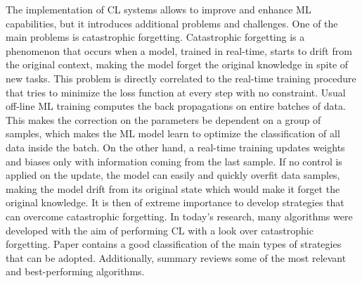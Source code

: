 \documentclass[12pt]{report}
\begin{document}
The implementation of CL systems allows to improve and enhance ML capabilities, but it introduces additional problems and challenges. One of the main problems is catastrophic forgetting. Catastrophic forgetting \cite{french1999catastrophic} is a phenomenon that occurs when a model, trained in real-time, starts to drift from the original context, making the model forget the original knowledge in spite of new tasks. This problem is directly correlated to the real-time training procedure that tries to minimize the loss function at every step with no constraint. Usual off-line ML training computes the back propagations on entire batches of data. This makes the correction on the parameters be dependent on a group of samples, which makes the ML model learn to optimize the classification of all data inside the batch. On the other hand, a real-time training updates weights and biases only with information coming from the last sample. If no control is applied on the update, the model can easily and quickly overfit data samples, making the model drift from its original state which would make it forget the original knowledge. It is then of extreme importance to develop strategies that can overcome catastrophic forgetting. In today's research, many algorithms were developed with the aim of performing CL with a look over catastrophic forgetting. Paper \cite{maltoni2019continuous} contains a good classification of the main types of strategies that can be adopted. Additionally, summary \cite{lesort2020continual} reviews some of the most relevant and best-performing algorithms. \\
\end{document}
